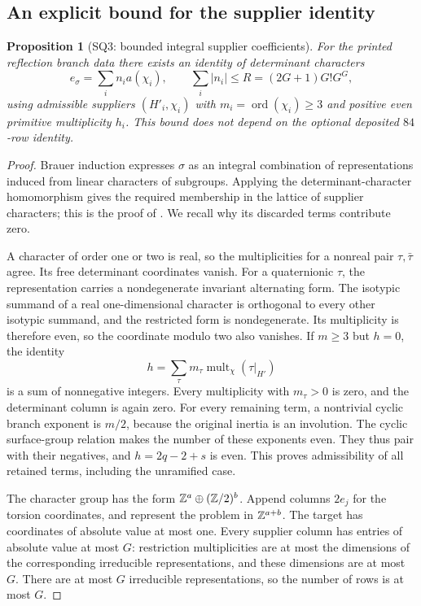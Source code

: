 \documentclass[11pt,a4paper]{article}
\newtheorem{proposition}[theorem]{Proposition}
\theoremstyle{definition}\newtheorem{definition}[theorem]{Definition}
\theoremstyle{remark}\newtheorem{remark}[theorem]{Remark}
\begin{document}
\subsection{An explicit bound for the supplier identity}

\begin{proposition}[SQ3: bounded integral supplier coefficients]\label{SQ3}
For the printed reflection branch data there exists an identity of determinant characters
\[
 e_\sigma=\sum_i n_i a(\chi_i),\qquad
 \sum_i|n_i|\le R=(2G+1)G!G^G,
\]
using admissible suppliers $(H'_i,\chi_i)$ with $m_i=\operatorname{ord}(\chi_i)\ge3$ and positive even primitive multiplicity $h_i$. This bound does not depend on the optional deposited $84$-row identity.
\end{proposition}
\begin{proof}
Brauer induction expresses $\sigma$ as an integral combination of representations induced from linear characters of subgroups. Applying the determinant-character homomorphism gives the required membership in the lattice of supplier characters; this is the proof of \citet[Section~5, Theorem \texttt{thm:brauer}]{Severn26}. We recall why its discarded terms contribute zero.

A character of order one or two is real, so the multiplicities for a nonreal pair $\tau,\bar\tau$ agree. Its free determinant coordinates vanish. For a quaternionic $\tau$, the representation carries a nondegenerate invariant alternating form. The isotypic summand of a real one-dimensional character is orthogonal to every other isotypic summand, and the restricted form is nondegenerate. Its multiplicity is therefore even, so the coordinate modulo two also vanishes. If $m\ge3$ but $h=0$, the identity
\[
 h=\sum_\tau m_\tau
       \operatorname{mult}_\chi(\tau|_{H'})
\]
is a sum of nonnegative integers. Every multiplicity with $m_\tau>0$ is zero, and the determinant column is again zero. For every remaining term, a nontrivial cyclic branch exponent is $m/2$, because the original inertia is an involution. The cyclic surface-group relation makes the number of these exponents even. They thus pair with their negatives, and $h=2q-2+s$ is even. This proves admissibility of all retained terms, including the unramified case.

The character group has the form $\mathbb Z^a\oplus(\mathbb Z/2)^b$. Append columns $2e_j$ for the torsion coordinates, and represent the problem in $\mathbb Z^{a+b}$. The target has coordinates of absolute value at most one. Every supplier column has entries of absolute value at most $G$: restriction multiplicities are at most the dimensions of the corresponding irreducible representations, and these dimensions are at most $G$. There are at most $G$ irreducible representations, so the number of rows is at most $G$.


\end{proof}
\end{document}
